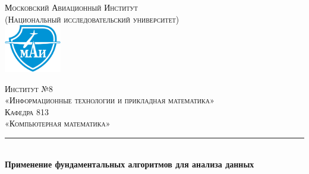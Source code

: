 \documentclass[a4paper,12pt]{article} %
\newcommand{\MAIInstitute}{8}
\newcommand{\MAIInstituteName}{Информационные технологии и прикладная математика}
\newcommand{\MAIDepartment}{813}
\newcommand{\MAIDepartmentName}{Компьютерная математика}
\begin{document}

\begin{titlepage} %
	\newcommand{\HRule}{\rule{\linewidth}{0.5mm}} %
	
	\center %
	
	
	\textsc{\large Московский Авиационный Институт \\ (Национальный исследовательский университет)}\\[1.25cm] %
	
	
	\includegraphics[width=2.5cm]{mai-logo.eps}
	
	
	
	\textsc{\Large Институт №\MAIInstitute \\ «\MAIInstituteName»}\\[0.5cm] %
	
	\textsc{\large Кафедра \MAIDepartment \\ «\MAIDepartmentName»}\\[0.5cm] %
	
	
	\HRule\\[0.4cm]
	
	{\huge\bfseries Применение фундаментальных алгоритмов для анализа данных}\\[0.5cm] %
	

\end{titlepage}
\end{document}
